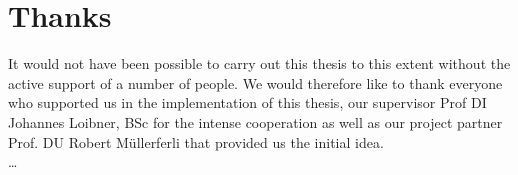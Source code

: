\section*{Thanks}
It would not have been possible to carry out this thesis to this extent without the active support of a number of people. We would therefore like to thank everyone who supported us in the implementation of this thesis, our supervisor Prof DI Johannes Loibner, BSc for the intense cooperation as well as our project partner Prof. DU Robert Müllerferli that provided us the initial idea. \\
\dots
